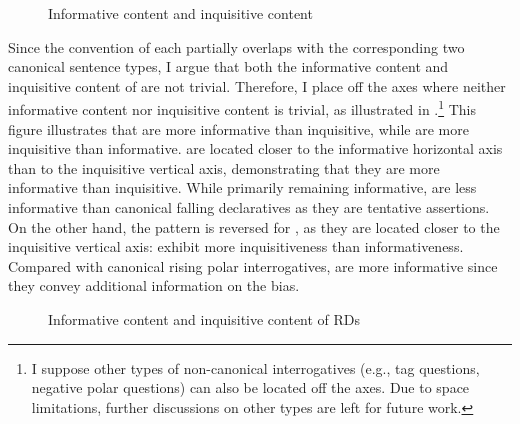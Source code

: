 \documentclass[output=paper,colorlinks,citecolor=brown]{langscibook}
\begin{document}
\begin{figure}
\centering
\caption{Informative content and inquisitive content}
\label{fig:2content:Hong}
\end{figure}

Since the convention of each  partially overlaps with the corresponding two canonical sentence types, I argue that both the informative content and inquisitive content of  are not trivial. Therefore, I place  off the axes where neither informative content nor inquisitive content is trivial, as illustrated in .\footnote{I suppose other types of non-canonical interrogatives (e.g., tag questions, negative polar questions) can also be located off the axes. Due to space limitations, further discussions on other types are left for future work.} This figure illustrates that  are more informative than inquisitive, while  are more inquisitive than informative.  are located closer to the informative horizontal axis than to the inquisitive vertical axis, demonstrating that they are more informative than inquisitive. While primarily remaining informative,  are less informative than canonical falling declaratives as they are tentative assertions. On the other hand, the pattern is reversed for , as they are located closer to the inquisitive vertical axis:  exhibit more inquisitiveness than informativeness. Compared with canonical rising polar interrogatives,  are more informative since they convey additional information on the bias. 

\begin{figure}
\centering
\caption{Informative content and inquisitive content of RDs}
\label{fig:fig2:Hong}
\end{figure}
\end{document}
